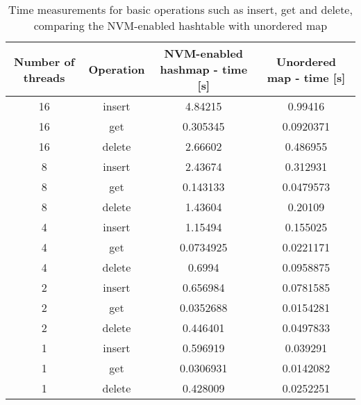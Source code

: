         \begin{table}[h]
            \caption{Time measurements for basic operations such as insert, get and delete, comparing the NVM-enabled hashtable with unordered map }\label{tab:tabela}
            \centering\footnotesize%
             \begin{tabular}{|c|c|c|c|}
                \toprule
                Number of threads & Operation & NVM-enabled hashmap - time {[}s{]} & Unordered map - time {[}s{]} \\
                \hline
                16                & insert    & 4.84215                            & 0.99416                      \\
                16                & get       & 0.305345                           & 0.0920371                    \\
                16                & delete    & 2.66602                            & 0.486955                     \\
                \midrule
                8                 & insert    & 2.43674                            & 0.312931                     \\
                8                 & get       & 0.143133                           & 0.0479573                    \\
                8                 & delete    & 1.43604                            & 0.20109                      \\
                \midrule
                4                 & insert    & 1.15494                            & 0.155025                     \\
                4                 & get       & 0.0734925                          & 0.0221171                    \\
                4                 & delete    & 0.6994                             & 0.0958875                    \\
                \midrule
                2                 & insert    & 0.656984                           & 0.0781585                    \\
                2                 & get       & 0.0352688                          & 0.0154281                    \\
                2                 & delete    & 0.446401                           & 0.0497833                    \\
                \midrule
                1                 & insert    & 0.596919                           & 0.039291                     \\
                1                 & get       & 0.0306931                          & 0.0142082                    \\
                1                 & delete    & 0.428009                           & 0.0252251                    \\
                \bottomrule
            \end{tabular}
        \end{table}
        
